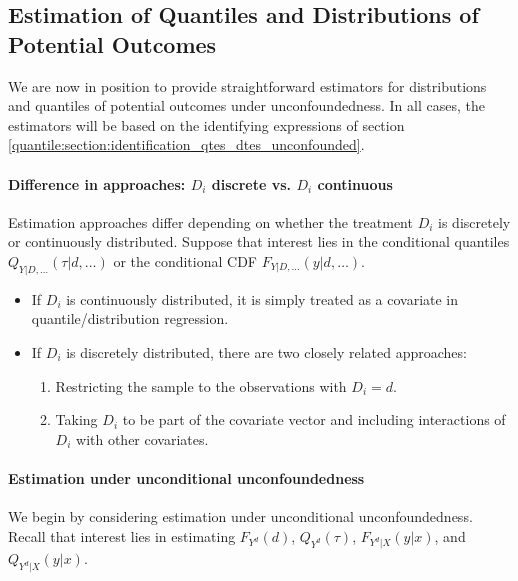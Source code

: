  	
 	
 
 \subsection{Estimation of Quantiles and Distributions of Potential Outcomes}
 
 We are now in position to provide straightforward estimators for distributions and quantiles of potential outcomes under unconfoundedness. In all cases, the estimators will be based on the identifying expressions of section   \ref{quantile:section:identification_qtes_dtes_unconfounded}.
 
 \paragraph{Difference in approaches: $D_i$ discrete vs. $D_i$ continuous}
 
 Estimation approaches differ depending on whether the treatment $D_i$ is discretely or continuously distributed. Suppose that interest lies in the 
 conditional quantiles $Q_{Y|D, \dots}(\tau|d, \dots)$ or the conditional CDF $F_{Y|D, \dots}(y|d, \dots)$.
 \begin{itemize}
 	\item If $D_i$ is continuously distributed, it is simply treated as a covariate in quantile/distribution regression. 
 	
 	\item If $D_i$ is discretely distributed, there are two closely related approaches:
 	\begin{enumerate}
 		\item Restricting the sample to the observations with $D_i=d$. 
 		
 		\item Taking $D_i$ to be part of the covariate vector and including interactions of $D_i$ with other covariates. 
 		
 	\end{enumerate}
 	
 	 
 	 
 \end{itemize}
  
  
  \paragraph{Estimation under unconditional unconfoundedness}
  
  
  We begin by considering  estimation under unconditional unconfoundedness.  Recall that interest lies in estimating $F_{Y^d}(d)$, $Q_{Y^d}(\tau)$, $F_{Y^d|X}(y|x)$, and $Q_{Y^d|X}(y|x)$.
   
